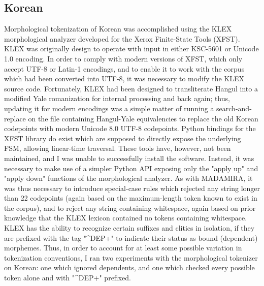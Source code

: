 \subsection{Korean}
Morphological tokenization of Korean was accomplished using the KLEX morphological analyzer developed for the Xerox Finite-State Tools (XFST). KLEX was originally design to operate with input in either KSC-5601 or Unicode 1.0 encoding. In order to comply with modern versions of XFST, which only accept UTF-8 or Latin-1 encodings, and to enable it to work with the corpus which had been converted into UTF-8, it was necessary to modify the KLEX source code. Fortunately, KLEX had been designed to transliterate Hangul into a modified Yale romanization for internal processing and back again; thus, updating it for modern encodings was a simple matter of running a search-and-replace on the file containing Hangul-Yale equivalencies to replace the old Korean codepoints with modern Unicode 8.0 UTF-8 codepoints.
Python bindings for the XFST library do exist which are supposed to directly expose the underlying FSM, allowing linear-time traversal. These tools have, however, not been maintained, and I was unable to successfully install the software. Instead, it was necessary to make use of a simpler Python API exposing only the "apply up" and "apply down" functions of the morphological analyzer. As with MADAMIRA, it was thus necessary to introduce special-case rules which rejected any string longer than 22 codepoints (again based on the maximum-length token known to exist in the corpus), and to reject any string containing whitespace, again based on prior knowledge that the KLEX lexicon contained no tokens containing whitespace.
KLEX has the ability to recognize certain suffixes and clitics in isolation, if they are prefixed with the tag "\^{}DEP+" to indicate their status as bound (dependent) morphemes. Thus, in order to account for at least some possible variation in tokenization conventions, I ran two experiments with the morphological tokenizer on Korean: one which ignored dependents, and one which checked every possible token alone and with "\^{}DEP+" prefixed.

